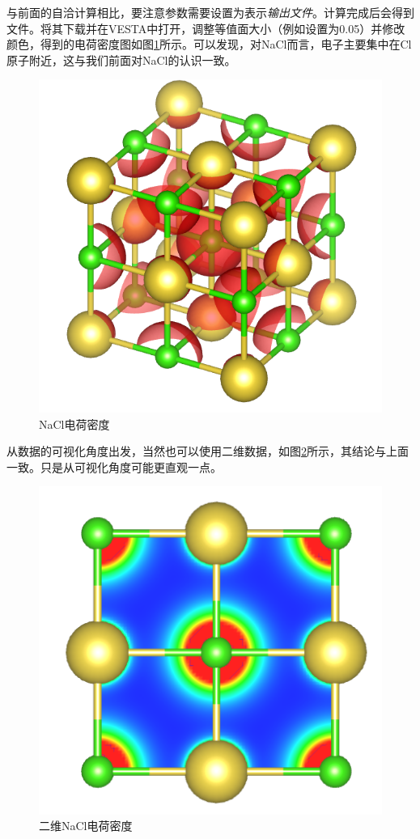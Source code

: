 与前面的自洽计算相比，要注意参数需要设置为表示\emph{输出文件}。计算完成后会得到文件。将其下载并在VESTA中打开，调整等值面大小（例如设置为0.05）并修改颜色，得到的电荷密度图如图\ref{fig:电荷密度与差分电荷密度-NaCl电荷密度}所示。可以发现，对NaCl而言，电子主要集中在Cl原子附近，这与我们前面对NaCl的认识一致。

\begin{figure}
    \centering
    \includegraphics[width=0.7\linewidth]{VASP计算/静态自洽与电荷密度/电荷密度与差分电荷密度/fig/NaCl电荷密度.png}
    \caption{NaCl电荷密度}
    \label{fig:电荷密度与差分电荷密度-NaCl电荷密度}
\end{figure}

从数据的可视化角度出发，当然也可以使用二维数据，如图\ref{fig:电荷密度与差分电荷密度-二维NaCl电荷密度}所示，其结论与上面一致。只是从可视化角度可能更直观一点。

\begin{figure}
    \centering
    \includegraphics[width=0.7\linewidth]{VASP计算/静态自洽与电荷密度/电荷密度与差分电荷密度/fig/二维NaCl电荷密度.png}
    \caption{二维NaCl电荷密度}
    \label{fig:电荷密度与差分电荷密度-二维NaCl电荷密度}
\end{figure}

